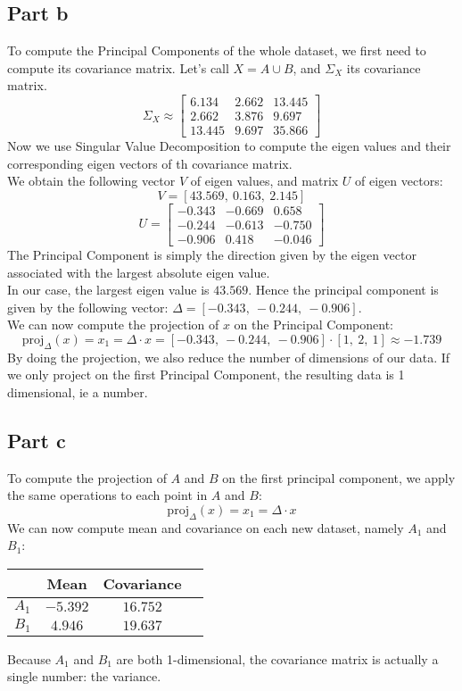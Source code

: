 \documentclass[a4paper, 10pt]{article}
\begin{document}
\subsection{Part b}
To compute the Principal Components of the whole dataset, we first need to compute its covariance matrix.
Let's call $X=A\cup B$, and $\Sigma_X$ its covariance matrix.
$$
\Sigma_X \approx \begin{bmatrix}
    6.134 & 2.662 & 13.445\\
    2.662 & 3.876 & 9.697\\
    13.445 & 9.697 & 35.866
\end{bmatrix}
$$
Now we use Singular Value Decomposition to compute the eigen values and their corresponding eigen vectors of th covariance
matrix.
\\
We obtain the following vector $V$ of eigen values, and matrix $U$ of eigen vectors:
$$
V = [43.569,\ 0.163,\ 2.145]
$$
$$
U = \begin{bmatrix}
    -0.343 & -0.669 & 0.658\\
    -0.244 & -0.613 & -0.750\\
    -0.906 & 0.418 & -0.046
\end{bmatrix}
$$
The Principal Component is simply the direction given by the eigen vector associated
with the largest absolute eigen value.
\\
In our case, the largest eigen value is $43.569$. Hence the principal component is given by the following vector: $\Delta = [-0.343,\ -0.244,\ -0.906]$.
\\
We can now compute the projection of $x$ on the Principal Component:
$$
\text{proj}_\Delta(x) = x_1 = \Delta \cdot x = [-0.343,\ -0.244,\ -0.906] \cdot [1,\ 2,\ 1] \approx -1.739
$$
By doing the projection, we also reduce the number of dimensions of our data. If we only project on the
first Principal Component, the resulting data is 1 dimensional, ie a number.

\subsection{Part c}
To compute the projection of $A$ and $B$ on the first principal component, we apply the same operations to
each point in $A$ and $B$:
$$
\text{proj}_\Delta(x) = x_1 = \Delta \cdot x 
$$
We can now compute mean and covariance on each new dataset, namely $A_1$ and $B_1$:
\begin{center}
\begin{tabular}{ |c|c|c|c| }
    \hline
    \  & Mean & Covariance \\ 
    \hline
    $A_1$ & $-5.392$ & $16.752$ \\
    \hline
    $B_1$ & $4.946$ & $19.637$ \\
    \hline
\end{tabular}
\end{center}
Because $A_1$ and $B_1$ are both 1-dimensional, the covariance matrix is actually a single number: the variance.
\end{document}
